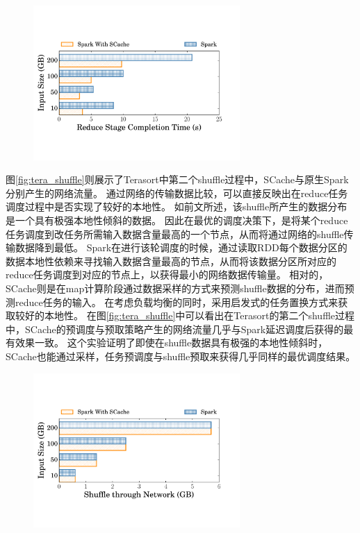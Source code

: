 \begin{figure}[!htp]
	\centering
	\includegraphics[width=0.7\textwidth]{../../PPoPP-2018/fig/tera.pdf}
\end{figure}

图\ref{fig:tera_shuffle}则展示了Terasort中第二个shuffle过程中，SCache与原生Spark分别产生的网络流量。
通过网络的传输数据比较，可以直接反映出在reduce任务调度过程中是否实现了较好的本地性。
如前文所述，该shuffle所产生的数据分布是一个具有极强本地性倾斜的数据。
因此在最优的调度决策下，是将某个reduce任务调度到改任务所需输入数据含量最高的一个节点，从而将通过网络的shuffle传输数据降到最低。
Spark在进行该轮调度的时候，通过读取RDD每个数据分区的数据本地性依赖来寻找输入数据含量最高的节点，从而将该数据分区所对应的reduce任务调度到对应的节点上，以获得最小的网络数据传输量。
相对的，SCache则是在map计算阶段通过数据采样的方式来预测shuffle数据的分布，进而预测reduce任务的输入。
在考虑负载均衡的同时，采用启发式的任务置换方式来获取较好的本地性。
在图\ref{fig:tera_shuffle}中可以看出在Terasort的第二个shuffle过程中，SCache的预调度与预取策略产生的网络流量几乎与Spark延迟调度后获得的最有效果一致。
这个实验证明了即使在shuffle数据具有极强的本地性倾斜时，SCache也能通过采样，任务预调度与shuffle预取来获得几乎同样的最优调度结果。

\begin{figure}[!htp]
	\centering
	\includegraphics[width=0.7\textwidth]{../../PPoPP-2018/fig/tera_shuffle.pdf}
\end{figure}

